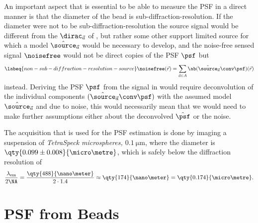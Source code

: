An important aspect that is essential to be able to measure the \ac{PSF} in a direct manner is that the diameter of the
    bead is sub-diffraction-resolution.
If the diameter were not to be sub-diffraction-resolution the source signal would be different from the
    \(\dirac_{\vec{a}}\) of , but rather some other support 
    limited source for which a model \(\hat{\source}_{\vec{a}}\) would be necessary to develop, and the noise-free
    sensed signal \(\noisefree\) would not be direct copies of the \ac{PSF} \(\psf\) but
    \begin{equation}
        \labeq{non-sub-diffraction-resolution-source}
        \noisefree(\vec{r}) = \sum_{\vec{a} \in A} \ab(\hat{\source}_{\vec{a}} \conv \psf)(\vec{r})
    \end{equation}
    instead.
Deriving the \ac{PSF} \(\psf\) from the signal in  would require 
    deconvolution of the individual components \((\hat{\source}_{\vec{a}} \conv \psf)\) with the assumed model 
    \(\hat{\source}_{\vec{a}}\) and due to noise, this would necessarily mean that we would need to make further 
    assumptions either about the deconvolved \(\hat{\psf}\) or the noise.

The acquisition that is used for the \ac{PSF} estimation is done by imaging a suspension of \emph{TetraSpeck\TM 
    microspheres, \(\qty{0.1}{\micro\metre}\)}, where the diameter is 
    \(\qty{0.099 \pm 0.008}{\micro\metre}\), which is safely below the diffraction resolution of 
    \begin{equation*}
        \frac{\lambda_{\text{em}}}{2\NA} = \frac{\qty{488}{\nano\meter}}{2\cdot 1.4} \approx \qty{174}{\nano\meter}
        = \qty{0.174}{\micro\metre}.
    \end{equation*}




\section{\ac{PSF} from  Beads}%

